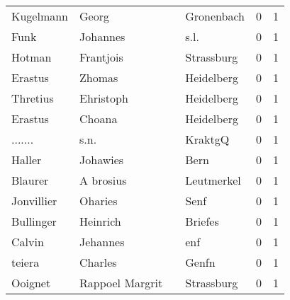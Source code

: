 \documentclass[10pt,a4paper,landscape]{article}
\begin{document}
\begin{longtable}{llllrr}
                Kugelmann &                              Georg &             &                                  Gronenbach &          0 &         1 \\
                     Funk &                           Johannes &             &                                        s.l. &          0 &         1 \\
                   Hotman &                          Frantjois &             &                                  Strassburg &          0 &         1 \\
                  Erastus &                             Zhomas &             &                                  Heidelberg &          0 &         1 \\
                 Thretius &                          Ehristoph &             &                                  Heidelberg &          0 &         1 \\
                  Erastus &                             Choana &             &                                  Heidelberg &          0 &         1 \\
                  ....... &                               s.n. &             &                                     KraktgQ &          0 &         1 \\
                   Haller &                           Johawies &             &                                        Bern &          0 &         1 \\
                  Blaurer &                          A brosius &             &                                  Leutmerkel &          0 &         1 \\
               Jonvillier &                            Oharies &             &                                        Senf &          0 &         1 \\
                Bullinger &                           Heinrich &             &                                     Briefes &          0 &         1 \\
                   Calvin &                           Jehannes &             &                                         enf &          0 &         1 \\
                   teiera &                            Charles &             &                                       Genfn &          0 &         1 \\
                  Ooignet &                    Rappoel Margrit &             &                                  Strassburg &          0 &         1 \\

\end{longtable}
\end{document}
